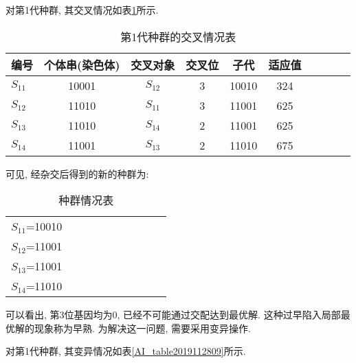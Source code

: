 对第1代种群, 其交叉情况如表\ref{AI_table2019112808}所示.

\begin{table} [H]
\caption{第1代种群的交叉情况表}
\begin{center}
\begin{tabular} {lccccccccc}
  \hline
编号	&个体串(染色体)&	交叉对象&	交叉位&	子代&	适应值\\
  \hline
$S_{11}$	&10001	&$S_{12}$	&3	&10010&	324\\
$S_{12}$	&11010	&$S_{11}$	&3	&11001&	625\\
$S_{13}$	&11010	&$S_{14}$	&2	&11001&	625\\
$S_{14}$	&11001	&$S_{13}$	&2	&11010&	675\\
\hline
\end{tabular}
\end{center}
\label{AI_table2019112808}
\end{table}
可见, 经杂交后得到的新的种群为:
\begin{table} [H]
\caption{种群情况表}
\begin{center}
\begin{tabular} {lccccccccc}
\hline
$S_{11}$=10010\\
$S_{12}$=11001\\
$S_{13}$=11001\\
$S_{14}$=11010\\
\hline
\end{tabular}
\end{center}
\end{table}
可以看出, 第3位基因均为0, 已经不可能通过交配达到最优解. 这种过早陷入局部最优解的现象称为早熟. 为解决这一问题, 需要采用变异操作.

对第1代种群, 其变异情况如表\ref{AI_table2019112809}所示.

